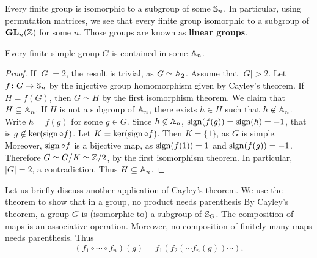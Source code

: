 Every finite group is isomorphic to a subgroup of some 
$\mathbb{S}_n$. 
In particular, using permutation matrices, 
we see that every finite group 
isomorphic to a subgroup of $\mathbf{GL}_n(\mathbb{Z})$ for some $n$.
Those groups are known as \textbf{linear groups}.

\begin{proposition}
Every finite simple group $G$ is contained in some $\mathbb{A}_n$.
\end{proposition}

\begin{proof}
If $|G|=2$, the result is trivial, as $G\simeq\mathbb{A}_2$. Assume 
that $|G|>2$.
Let $f\colon G\to\mathbb{S}_n$ by the injective group homomorphism
given by Cayley's theorem. If $H=f(G)$, then 
$G\simeq H$ by the first isomorphism theorem. 
We claim that $H\subseteq\mathbb{A}_n$. If
$H$ is not a subgroup of $\mathbb{A}_n$, there exists $h\in H$ such that  $h\not\in\mathbb{A}_n$. Write $h=f(g)$ for some 
$g\in G$. Since $h\not\in\mathbb{A}_n$,
$\operatorname{sign}(f(g))=\operatorname{sign}(h)=-1$, that is 
$g\not\in\ker(\operatorname{sign}\circ f)$.
Let $K=\ker(\operatorname{sign}\circ f)$. Then $K=\{1\}$, as $G$ is simple. Moreover, $\operatorname{sign}\circ f$ is a bijective map, as
$\operatorname{sign}(f(1))=1$ and $\operatorname{sign}(f(g))=-1$. Therefore 
$G\simeq G/K\simeq\mathbb{Z}/2$, by the first isomorphism theorem.  
In particular, $|G|=2$, a contradiction. Thus $H\subseteq\mathbb{A}_n$.
\end{proof}

Let us briefly discuss another application of Cayley's theorem. 
We use the theorem to show that in a group, 
no product needs parenthesis 
By Cayley's theorem, a group $G$ is (isomorphic to) a 
subgroup of $\mathbb{S}_G$. The composition of maps is an associative operation. Moreover, no composition of finitely many maps 
needs parenthesis. Thus 
\[
(f_1\circ\cdots\circ f_n)(g)=f_1(f_2(\cdots f_n(g))\cdots).
\]